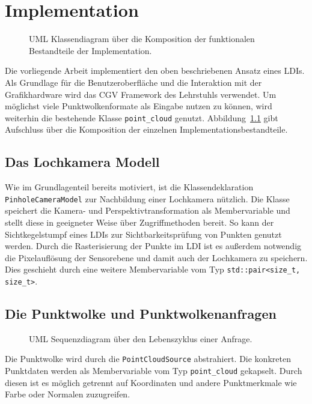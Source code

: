 \documentclass[hyperref, beleg, german]{cgvpub}
\begin{document}
\chapter{Implementation}

\begin{figure}
	\centering
	
	\caption{UML Klassendiagram über die Komposition der funktionalen 
	Bestandteile der Implementation.}%
	\label{fig:umloverview}
\end{figure}

Die vorliegende Arbeit implementiert den oben beschriebenen Ansatz eines LDIs.
Als Grundlage für die Benutzeroberfläche und die Interaktion mit der
Grafikhardware wird das CGV Framework des Lehrstuhls verwendet. Um möglichst
viele Punktwolkenformate als Eingabe nutzen zu können, wird weiterhin die
bestehende Klasse \texttt{point\_cloud} genutzt.
Abbildung~\ref{fig:umloverview} gibt Aufschluss über die Komposition der
einzelnen Implementationsbestandteile.

\section{Das Lochkamera Modell}

Wie im Grundlagenteil bereits motiviert, ist die Klassendeklaration
\texttt{PinholeCameraModel} zur Nachbildung einer Lochkamera nützlich. Die
Klasse speichert die Kamera- und Perspektivtransformation als Membervariable
und stellt diese in geeigneter Weise über Zugriffmethoden bereit. So kann der
Sichtkegelstumpf eines LDIs zur Sichtbarkeitsprüfung von Punkten genutzt
werden. Durch die Rasterisierung der Punkte im LDI ist es außerdem notwendig
die Pixelauflösung der Sensorebene und damit auch der Lochkamera zu speichern.
Dies geschieht durch eine weitere Membervariable vom Typ
\texttt{std::pair<size\_t, size\_t>}.

\section{Die Punktwolke und Punktwolkenanfragen}

\begin{figure}
	\centering
	
	\caption{UML Sequenzdiagram über den Lebenszyklus einer 
	Anfrage.}%
	\label{fig:umlquerylife}
\end{figure}

Die Punktwolke wird durch die \texttt{PointCloudSource} abstrahiert. Die
konkreten Punktdaten werden als Membervariable vom Typ \texttt{point\_cloud}
gekapselt. Durch diesen ist es möglich getrennt auf Koordinaten und andere
Punktmerkmale wie Farbe oder Normalen zuzugreifen.
\end{document}
